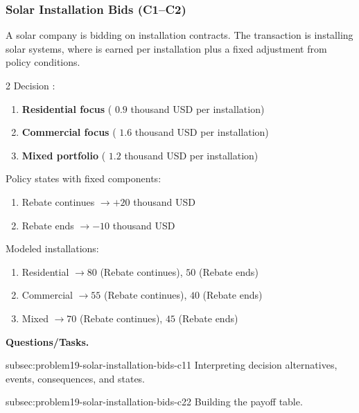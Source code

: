 	\subsubsection{Solar Installation Bids (C1--C2)}
	\label{sec:problem19-solar-installation-bids-c1-c2}
	A solar company is bidding on installation contracts. The transaction is installing solar systems, where  is earned per installation plus a fixed  adjustment from policy conditions.

	\begin{multicols}{2}
		Decision :
		\begin{enumerate}[label=\arabic*.]
			\item \textbf{Residential focus} ( $0.9$ thousand USD per installation)
			\item \textbf{Commercial focus} ( $1.6$ thousand USD per installation)
			\item \textbf{Mixed portfolio} ( $1.2$ thousand USD per installation)
		\end{enumerate}

		Policy states with fixed  components:
		\begin{enumerate}[label=\arabic*.]
			\item Rebate continues $\to +20$ thousand USD
			\item Rebate ends $\to -10$ thousand USD
		\end{enumerate}

			\columnbreak

		Modeled installations:
		\begin{enumerate}[label=\arabic*.]
			\item Residential $\to 80$ (Rebate continues), $50$ (Rebate ends)
			\item Commercial $\to 55$ (Rebate continues), $40$ (Rebate ends)
			\item Mixed $\to 70$ (Rebate continues), $45$ (Rebate ends)
		\end{enumerate}
	\end{multicols}

	\textbf{Questions/Tasks.}
	\begin{enumerate}
		\CriterionTask
		{subsec:problem19-solar-installation-bids-c1}{1}
		{Interpreting decision alternatives, events, consequences, and states.}

		\CriterionTask
		{subsec:problem19-solar-installation-bids-c2}{2}
		{Building the payoff table.}
	\end{enumerate}

